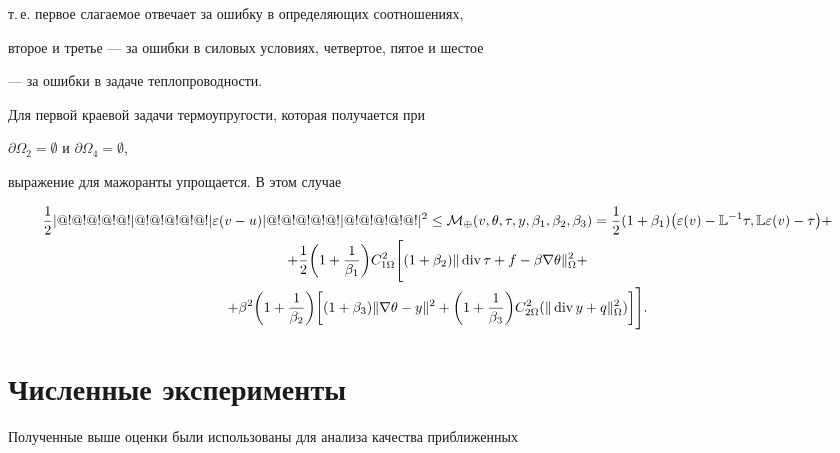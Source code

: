 т.\,е. первое слагаемое отвечает за ошибку в определяющих соотношениях,


второе и третье --- за ошибки в силовых условиях, четвертое, пятое и шестое


--- за ошибки в задаче теплопроводности.





Для первой краевой задачи термоупругости, которая получается при


$\partial \Omega_2 =\emptyset$ и $\partial\Omega_4=\emptyset$,


выражение для мажоранты упрощается. В этом случае


\begin{gather*}


\frac{1}{2}\norme{\varepsilon(v-u)}^2 \le


{\cal M}_\oplus(v,\theta,\tau,y,\beta_1,\beta_2,\beta_3)=


\frac{1}{2}(1+\beta_1)


\big(\varepsilon(v) -{\Bbb L}^{-1}\tau,


{\Bbb L}\varepsilon(v) - \tau\big)+ \\


%


+\frac{1}{2}\bigg(1+\frac{1}{\beta_1}\bigg) C_{1\Omega}^2 \Bigg[


(1+\beta_2)\norm{\Div \tau + f - \beta \nabla \theta}^2_{\Omega}+\\


%


+\beta^2 \bigg(1+\frac{1}{\beta_2}\bigg)


\bigg[ (1+\beta_3) \norm{\nabla \theta - y}^2


+ \bigg(1+\frac{1}{\beta_3} \bigg)


C_{2\Omega}^2 (\norm{\Div y + q}^2_{\Omega}


)\bigg]\Bigg].


\end{gather*}








\section{Численные эксперименты}





Полученные выше оценки были использованы для анализа качества приближенных 



